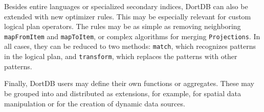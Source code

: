 Besides entire languages or specialized secondary indices, DortDB can also be extended with new optimizer rules. This may be especially relevant for custom logical plan operators. The rules may be as simple as removing neighboring \texttt{mapFromItem} and \texttt{mapToItem}, or complex algorithms for merging \texttt{Projections}. In all cases, they can be reduced to two methods: \texttt{match}, which recognizes patterns in the logical plan, and \texttt{transform}, which replaces the patterns with other patterns.

Finally, DortDB users may define their own functions or aggregates. These may be grouped into and distributed as extensions, for example, for spatial data manipulation or for the creation of dynamic data sources.
